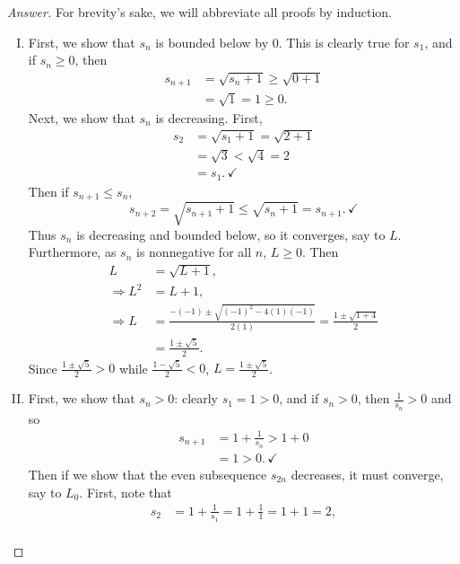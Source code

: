 \documentclass[12pt]{article}
\theoremstyle{definition}
\begin{document}
\begin{proof}[Answer]
    For brevity's sake, we will abbreviate all proofs by induction. 
    \begin{enumerate}[(I)]
        \item First, we show that $s_n$ is bounded below by $0$. This is clearly true for $s_1$, and if $s_n \geq 0$, then 
        \begin{align*}
            s_{n+1} & = \sqrt{ s_n + 1 } \geq \sqrt{ 0 + 1 } \\ 
            & = \sqrt{1} = 1 \geq 0 .
        \end{align*}
        Next, we show that $s_n$ is decreasing. First, 
        \begin{align*}
            s_2 & = \sqrt{ s_1 + 1 } = \sqrt{ 2 + 1 } \\ 
            & = \sqrt{3} < \sqrt{4} = 2 \\
            & = s_1 . \, \checkmark
        \end{align*}
        Then if $s_{n+1} \leq s_n$, 
        \[
            s_{n+2} = \sqrt{ s_{n+1} + 1 } \leq \sqrt{ s_n + 1 } = s_{n+1} . \, \checkmark 
        \]
        Thus $s_n$ is decreasing and bounded below, so it converges, say to $L$. Furthermore, as $s_n$ is nonnegative for all $n$, $L \geq 0$. Then 
        \begin{align*}
            L & = \sqrt{L + 1} , \\ 
            \Rightarrow L^2 & = L + 1 , \\ 
            \Rightarrow L & = \frac{-(-1) \pm \sqrt{ (-1)^2 - 4(1)(-1) }}{2(1)} = \frac{ 1 \pm \sqrt{1 + 4} }{2} \\ 
            & = \frac{1 \pm \sqrt{5}}{2} . 
        \end{align*}
        Since $\frac{1 \pm \sqrt{5}}{2} > 0$ while $\frac{1 - \sqrt{5}}{2} < 0$, $L = \frac{1 \pm \sqrt{5}}{2}$. 
        \item First, we show that $s_n > 0$: clearly $s_1 = 1 > 0$, and if $s_n > 0$, then $\frac{1}{s_n} > 0$ and so 
        \begin{align*}
            s_{n+1} & = 1 + \frac{1}{s_n} > 1 + 0 \\ 
            & = 1 > 0 . \, \checkmark
        \end{align*}
        Then if we show that the even subsequence $s_{2n}$ decreases, it must converge, say to $L_0$. First, note that 
        \begin{align*}
            s_2 & = 1 + \frac{1}{s_1} = 1 + \frac{1}{1} = 1 + 1 = 2 , \\ 

\end{align*}
\end{enumerate}
\end{proof}
\end{document}
